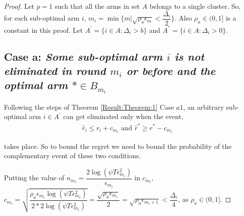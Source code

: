 \begin{proof}
Let $p=1$ such that all the arms in set $A$ belongs to a single cluster. So, for each sub-optimal arm ${i}$, $m_{i}=\min{\lbrace m|\sqrt{\rho_{a}\epsilon_{m}} < \dfrac{\Delta_{i}}{2} \rbrace}$. Also $\rho_{a}\in (0,1]$ is a constant in this proof. Let $A^{'}=\lbrace i\in A: \Delta_{i} > b \rbrace$ and $A^{''}=\lbrace i\in A: \Delta_{i} > 0 \rbrace$.


\subsection*{Case a: \textit{Some sub-optimal arm ${i}$ is not eliminated in round $m_{i}$ or before and the optimal arm ${*}\in B_{m_{i}}$}}

  
	Following the steps of Theorem \ref{Result:Theorem:1} Case $a1$, an arbitrary sub-optimal arm ${i}\in A^{'}$ can get eliminated only when the event,
	\begin{align}
	\hat{r}_{i}  \le r_{i} + c_{m_{i}} \text{ and } \label{eq:appA:armelim-casea}
 	\hat{r}^{*}\geq  r^{*} - c_{m_{i}}
	\end{align}
	
	takes place. So to bound the regret we need to bound the probability of the complementary event of these two conditions.
  
  Putting the value of $n_{m_{i}}=\dfrac{2\log{(\psi T\epsilon_{m_{i}}^{2})}}{\epsilon_{m_{i}}}$ in $c_{m_{i}}$,
  $c_{m_{i}}=\sqrt{\dfrac{\rho_{a}\epsilon_{m_{i}}\log (\psi T\epsilon_{m_{i}}^{2})}{2*2 \log(\psi T\epsilon_{m_{i}}^{2})}}=\dfrac{\sqrt{\rho_{a}\epsilon_{m_{i}}}}{2} = \sqrt{\rho_{a}\epsilon_{m_{i}+1}} < \dfrac{\Delta_{i}}{4} $, as $\rho_{a}\in (0,1]$.
  

\end{proof}
